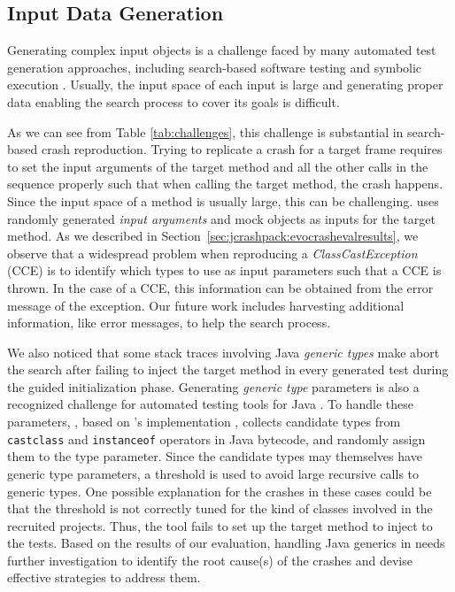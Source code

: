 \subsection{Input Data Generation}

Generating complex input objects is a challenge faced by many automated test generation approaches, including search-based software testing and symbolic execution \cite{braione2017tardis}.
Usually, the input space of each input is large and generating proper data enabling the search process to cover its goals is difficult.

As we can see from Table \ref{tab:challenges}, this challenge is substantial in search-based crash reproduction.
Trying to replicate a crash for a target frame requires to set the input arguments of the target method and all the other calls in the sequence properly such that when calling the target method, the crash happens.
Since the input space of a method is usually large, this can be challenging.
\evocrash uses randomly generated \emph{input arguments} and mock objects as inputs for the target method.
As we described in Section~\ref{sec:jcrashpack:evocrashevalresults}, we observe that a widespread problem when reproducing a \textit{ClassCastException} (CCE) is to identify which types to use as input parameters such that a CCE is thrown.
In the case of a CCE, this information can be obtained from the error message of the exception. Our future work includes harvesting additional information, like error messages, to help the search process. 

We also noticed that some stack traces involving Java \emph{generic types} make \evocrash abort the search after failing to inject the target method in every generated test during the guided initialization phase.
Generating \emph{generic type} parameters is also a recognized challenge for automated testing tools for Java \cite{fraser2014automated}.
To handle these parameters, \evocrash, based on \evosuite's implementation \cite{fraser2014automated}, collects candidate types from \texttt{castclass} and \texttt{in\-stance\-of} operators in Java bytecode, and randomly assign them to the type parameter.
Since the candidate types may themselves have generic type parameters, a threshold is used to avoid large recursive calls to generic types.
One possible explanation for the crashes in these cases could be that the threshold is not correctly tuned for the kind of classes involved in the recruited projects.
Thus, the tool fails to set up the target method to inject to the tests.
Based on the results of our evaluation, handling Java generics in \evocrash needs further investigation to identify the root cause(s) of the crashes and devise effective strategies to address them.

